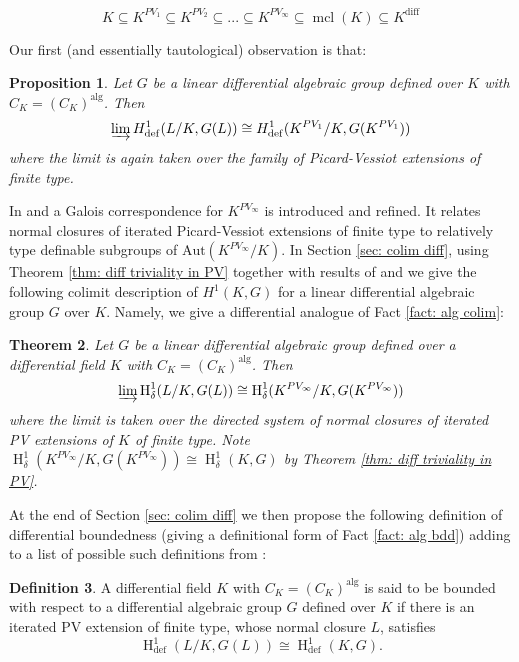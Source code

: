 \documentclass{amsart}
\newtheorem{theorem}{Theorem}[section]
\newtheorem{proposition}[theorem]{Proposition}
\theoremstyle{definition}
\newtheorem{definition}[theorem]{Definition}
\theoremstyle{remark}
\numberwithin{equation}{section}
\def \defin {\operatorname{def}}
\def \HH {\operatorname{H}}
\def \diff {\operatorname{diff}}
\def \alg {\operatorname{alg}}
\def \aut {\text{Aut}}
\def \mcl {\operatorname{mcl}}
\begin{document}
$$K \subseteq K^{PV_1}\subseteq K^{PV_2} \subseteq ...\subseteq  K^{PV_\infty} \subseteq \mcl(K) \subseteq K^{\diff}$$

Our first (and essentially tautological) observation is that:

\begin{proposition}
    Let $G$ be a linear differential algebraic group defined over $K$ with $C_K = (C_K)^{\alg}$. Then $$\varinjlim H^1_{\defin}(L/K,G(L)) \cong H^1_{\defin}(K^{PV_1}/K,G(K^{PV_1}))$$ where the limit is again taken over the family of Picard-Vessiot extensions of finite type. 
\end{proposition}

In \cite{magid2022completepicardvessiotclosure} and  \cite{meretzky2026galoistheoryautomorphismgroups} a Galois correspondence for $K^{PV_\infty}$ is introduced and refined. It relates normal closures of iterated Picard-Vessiot extensions of finite type to relatively type definable subgroups of $\aut(K^{PV_\infty}/K)$. In Section \ref{sec: colim diff}, using Theorem \ref{thm: diff triviality in PV} together with results of \cite{magid2022completepicardvessiotclosure} and  \cite{meretzky2026galoistheoryautomorphismgroups} we give the following colimit description of $H^1(K,G)$ for a linear differential algebraic group $G$ over $K$. Namely, we give a differential analogue of Fact \ref{fact: alg colim}:

\begin{theorem}
    Let $G$ be a linear differential algebraic group defined over a differential field $K$ with $C_K = (C_K)^{\alg}$. Then $$\varinjlim\HH^1_{\delta}(L/K,G(L)) \cong \HH_{\delta}^{1}(K^{PV_\infty}/K,G(K^{PV_\infty}))$$ where the limit is taken over the directed system of normal closures of iterated PV extensions of $K$ of finite type. Note $\HH_{\delta}^{1}(K^{PV_\infty}/K,G(K^{PV_\infty}))\cong \HH^1_{\delta}(K,G)$ by Theorem \ref{thm: diff triviality in PV}.
\end{theorem}

At the end of Section \ref{sec: colim diff} we then propose the following definition of differential boundedness (giving a definitional form of Fact \ref{fact: alg bdd}) adding to a list of possible such definitions from \cite{AnandDavidComm}:

\begin{definition}\relax
    A differential field $K$ with $C_K = (C_K)^{\alg}$ is said to be bounded with respect to a differential algebraic group $G$ defined over $K$ if there is an iterated PV extension of finite type, whose normal closure $L$, satisfies $$\HH^1_{\defin}(L/K,G(L)) \cong \HH^1_{\defin}(K,G).$$
\end{definition}
\end{document}
